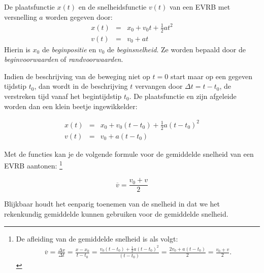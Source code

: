 \documentclass{ximera}
\begin{document}
\begin{theorem}
De plaatsfunctie $x(t)$ en de snelheidsfunctie $v(t)$ van een EVRB met versnelling $a$ worden gegeven door:
\[
\begin{array}{rcl}
x(t)&=&x_0+v_0t+\frac{1}{2}at^2\\
v(t)&=&v_0+at
\end{array}
\]
Hierin is $x_0$ de \textit{beginpositie} en $v_0$ de \textit{beginsnelheid}. Ze worden bepaald door de \textit{beginvoorwaarden} of \textit{randvoorwaarden}.
\end{theorem}	

Indien de beschrijving van de beweging niet op $t=0$ start maar op een gegeven tijdstip $t_0$, dan wordt in de beschrijving $t$ vervangen door $\Delta t= t-t_0$, de verstreken tijd vanaf het begintijdstip $t_0$. De plaatsfunctie en zijn afgeleide worden dan een klein beetje ingewikkelder:

\[
\begin{array}{rcl}
x(t)&=&x_0+v_0(t-t_0)+\frac{1}{2}a(t-t_0)^2\\
v(t)&=&v_0+a(t-t_0)
\end{array}
\]

Met de functies kan je de volgende formule voor de gemiddelde snelheid van een EVRB aantonen:%
\footnote{De afleiding van de gemiddelde snelheid is als volgt:
\begin{eqnarray*}
\overline{v}=\frac{\Delta x}{\Delta t}=\frac{x-x_0}{t-t_0}=\frac{v_0(t-t_0)+\frac{1}{2}a(t-t_0)^2}{(t-t_0)}=\frac{2v_0+a(t-t_0)}{2}=\frac{v_0+v}{2}.
\end{eqnarray*}}

\[
\overline{v}=\frac{v_0+v}{2}
\]

Blijkbaar houdt het eenparig toenemen van de snelheid in dat we het rekenkundig gemiddelde kunnen gebruiken voor de gemiddelde snelheid.



\end{document}
